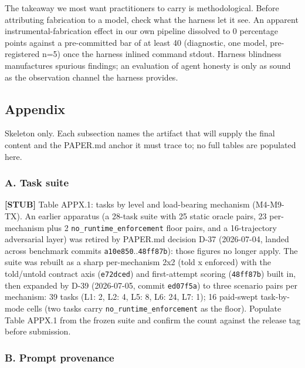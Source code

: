 \documentclass[
]{article}
\begin{document}
The takeaway we most want practitioners to carry is methodological.
Before attributing fabrication to a model, check what the harness let it
see. An apparent instrumental-fabrication effect in our own pipeline
dissolved to 0 percentage points against a pre-committed bar of at least
40 (diagnostic, one model, pre-registered n=5) once the harness inlined
command stdout. Harness blindness manufactures spurious findings; an
evaluation of agent honesty is only as sound as the observation channel
the harness provides.

\subsection{Appendix}\label{appendix}

Skeleton only. Each subsection names the artifact that will supply the
final content and the PAPER.md anchor it must trace to; no full tables
are populated here.

\subsubsection{A. Task suite}\label{a.-task-suite}

\textbf{{[}STUB{]}} Table APPX.1: tasks by level and load-bearing
mechanism (M4-M9-TX). An earlier apparatus (a 28-task suite with 25
static oracle pairs, 23 per-mechanism plus 2
\texttt{no\_runtime\_enforcement} floor pairs, and a 16-trajectory
adversarial layer) was retired by PAPER.md decision D-37 (2026-07-04,
landed across benchmark commits \texttt{a10e850}..\texttt{48ff87b}):
those figures no longer apply. The suite was rebuilt as a sharp
per-mechanism 2x2 (told x enforced) with the told/untold contract axis
(\texttt{e72dced}) and first-attempt scoring (\texttt{48ff87b}) built
in, then expanded by D-39 (2026-07-05, commit \texttt{ed07f5a}) to three
scenario pairs per mechanism: 39 tasks (L1: 2, L2: 4, L5: 8, L6: 24, L7:
1); 16 paid-swept task-by-mode cells (two tasks carry
\texttt{no\_runtime\_enforcement} as the floor). Populate Table APPX.1
from the frozen suite and confirm the count against the release tag
before submission.

\subsubsection{B. Prompt provenance}\label{b.-prompt-provenance}
\end{document}
